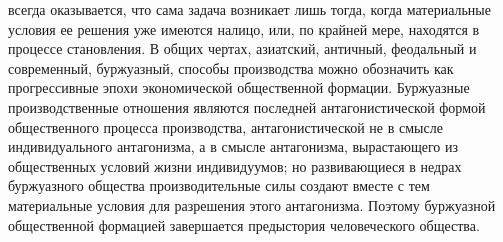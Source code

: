 \documentclass[12pt]{article}
\newcommand{\parnum}{(\arabic{parcount})}
\newcounter{parcount}
\newenvironment{parnumbers}{%
  \par%
  \everypar{\noindent \stepcounter{parcount}\marginpar[]{\parnum}}%
}{}
\begin{document}
\begin{parnumbers}
всегда оказывается, что сама задача возникает лишь тогда, когда материальные условия ее решения уже имеются налицо, или, по крайней мере, находятся в процессе становления. В общих чертах, азиатский, античный, феодальный и современный, буржуазный, способы производства можно обозначить как прогрессивные эпохи экономической общественной формации. Буржуазные производственные отношения являются последней антагонистической формой общественного процесса производства, антагонистической не в смысле индивидуального антагонизма, а в смысле антагонизма, вырастающего из общественных условий жизни индивидуумов; но развивающиеся в недрах буржуазного общества производительные силы создают вместе с тем материальные условия для разрешения этого антагонизма. Поэтому буржуазной общественной формацией завершается предыстория человеческого общества.


\end{parnumbers}
\end{document}
